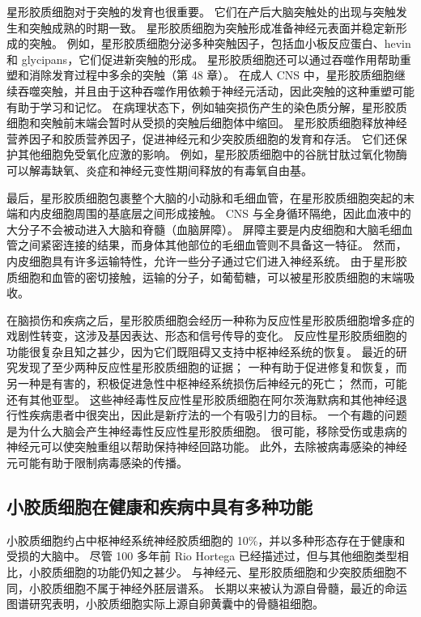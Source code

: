 星形胶质细胞对于突触的发育也很重要。 它们在产后大脑突触处的出现与突触发生和突触成熟的时期一致。 星形胶质细胞为突触形成准备神经元表面并稳定新形成的突触。 例如，星形胶质细胞分泌多种突触因子，包括血小板反应蛋白、hevin 和 glycipans，它们促进新突触的形成。 星形胶质细胞还可以通过吞噬作用帮助重塑和消除发育过程中多余的突触（第 48 章）。 在成人 CNS 中，星形胶质细胞继续吞噬突触，并且由于这种吞噬作用依赖于神经元活动，因此突触的这种重塑可能有助于学习和记忆。 在病理状态下，例如轴突损伤产生的染色质分解，星形胶质细胞和突触前末端会暂时从受损的突触后细胞体中缩回。 星形胶质细胞释放神经营养因子和胶质营养因子，促进神经元和少突胶质细胞的发育和存活。 它们还保护其他细胞免受氧化应激的影响。 例如，星形胶质细胞中的谷胱甘肽过氧化物酶可以解毒缺氧、炎症和神经元变性期间释放的有毒氧自由基。

最后，星形胶质细胞包裹整个大脑的小动脉和毛细血管，在星形胶质细胞突起的末端和内皮细胞周围的基底层之间形成接触。 CNS 与全身循环隔绝，因此血液中的大分子不会被动进入大脑和脊髓（血脑屏障）。 屏障主要是内皮细胞和大脑毛细血管之间紧密连接的结果，而身体其他部位的毛细血管则不具备这一特征。 然而，内皮细胞具有许多运输特性，允许一些分子通过它们进入神经系统。 由于星形胶质细胞和血管的密切接触，运输的分子，如葡萄糖，可以被星形胶质细胞的末端吸收。

在脑损伤和疾病之后，星形胶质细胞会经历一种称为反应性星形胶质细胞增多症的戏剧性转变，这涉及基因表达、形态和信号传导的变化。 反应性星形胶质细胞的功能很复杂且知之甚少，因为它们既阻碍又支持中枢神经系统的恢复。 最近的研究发现了至少两种反应性星形胶质细胞的证据； 一种有助于促进修复和恢复，而另一种是有害的，积极促进急性中枢神经系统损伤后神经元的死亡； 然而，可能还有其他亚型。 这些神经毒性反应性星形胶质细胞在阿尔茨海默病和其他神经退行性疾病患者中很突出，因此是新疗法的一个有吸引力的目标。 一个有趣的问题是为什么大脑会产生神经毒性反应性星形胶质细胞。 很可能，移除受伤或患病的神经元可以使突触重组以帮助保持神经回路功能。 此外，去除被病毒感染的神经元可能有助于限制病毒感染的传播。

\subsection{小胶质细胞在健康和疾病中具有多种功能}

小胶质细胞约占中枢神经系统神经胶质细胞的 10\%，并以多种形态存在于健康和受损的大脑中。 尽管 100 多年前 Rio Hortega 已经描述过，但与其他细胞类型相比，小胶质细胞的功能仍知之甚少。 与神经元、星形胶质细胞和少突胶质细胞不同，小胶质细胞不属于神经外胚层谱系。 长期以来被认为源自骨髓，最近的命运图谱研究表明，小胶质细胞实际上源自卵黄囊中的骨髓祖细胞。

